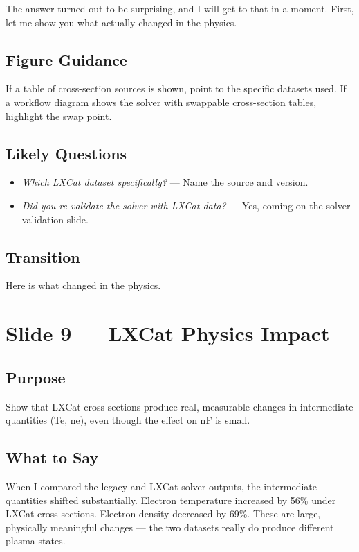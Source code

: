 \documentclass[12pt,a4paper]{article}
\begin{document}
The answer turned out to be surprising, and I will get to that
in a moment. First, let me show you what actually changed
in the physics.

\subsection*{Figure Guidance}
If a table of cross-section sources is shown, point to the specific
datasets used. If a workflow diagram shows the solver with swappable
cross-section tables, highlight the swap point.

\subsection*{Likely Questions}
\begin{itemize}
  \item \emph{Which LXCat dataset specifically?}
    --- Name the source and version.
  \item \emph{Did you re-validate the solver with LXCat data?}
    --- Yes, coming on the solver validation slide.
\end{itemize}

\subsection*{Transition}
Here is what changed in the physics.

\clearpage

\section{Slide 9 --- LXCat Physics Impact}
\label{sec:slide9}

\subsection*{Purpose}
Show that LXCat cross-sections produce real, measurable changes in
intermediate quantities (Te, ne), even though the effect on nF is
small.

\subsection*{What to Say}

When I compared the legacy and LXCat solver outputs, the intermediate
quantities shifted substantially. Electron temperature increased by
56\% under LXCat cross-sections. Electron density decreased by 69\%.
These are large, physically meaningful changes --- the two datasets
really do produce different plasma states.
\end{document}
